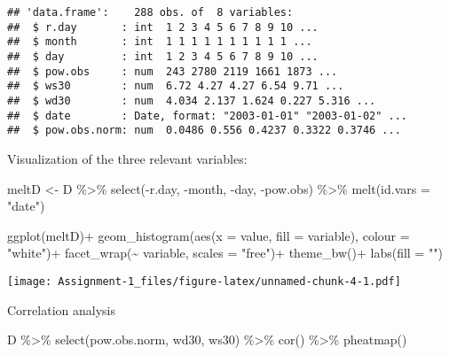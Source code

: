 \documentclass[
]{article}
\newenvironment{Shaded}{\begin{snugshade}}{\end{snugshade}}
\newcommand{\AttributeTok}[1]{\textcolor[rgb]{0.77,0.63,0.00}{#1}}
\newcommand{\FunctionTok}[1]{\textcolor[rgb]{0.00,0.00,0.00}{#1}}
\newcommand{\NormalTok}[1]{#1}
\newcommand{\OtherTok}[1]{\textcolor[rgb]{0.56,0.35,0.01}{#1}}
\newcommand{\SpecialCharTok}[1]{\textcolor[rgb]{0.00,0.00,0.00}{#1}}
\newcommand{\StringTok}[1]{\textcolor[rgb]{0.31,0.60,0.02}{#1}}
\begin{document}
\begin{verbatim}
## 'data.frame':    288 obs. of  8 variables:
##  $ r.day       : int  1 2 3 4 5 6 7 8 9 10 ...
##  $ month       : int  1 1 1 1 1 1 1 1 1 1 ...
##  $ day         : int  1 2 3 4 5 6 7 8 9 10 ...
##  $ pow.obs     : num  243 2780 2119 1661 1873 ...
##  $ ws30        : num  6.72 4.27 4.27 6.54 9.71 ...
##  $ wd30        : num  4.034 2.137 1.624 0.227 5.316 ...
##  $ date        : Date, format: "2003-01-01" "2003-01-02" ...
##  $ pow.obs.norm: num  0.0486 0.556 0.4237 0.3322 0.3746 ...
\end{verbatim}

Visualization of the three relevant variables:

\begin{Shaded}
\begin{Highlighting}[]
\NormalTok{meltD }\OtherTok{\textless{}{-}}\NormalTok{ D }\SpecialCharTok{\%\textgreater{}\%}
  \FunctionTok{select}\NormalTok{(}\SpecialCharTok{{-}}\NormalTok{r.day, }\SpecialCharTok{{-}}\NormalTok{month, }\SpecialCharTok{{-}}\NormalTok{day, }\SpecialCharTok{{-}}\NormalTok{pow.obs) }\SpecialCharTok{\%\textgreater{}\%}
  \FunctionTok{melt}\NormalTok{(}\AttributeTok{id.vars =} \StringTok{"date"}\NormalTok{)}

\FunctionTok{ggplot}\NormalTok{(meltD)}\SpecialCharTok{+}
  \FunctionTok{geom\_histogram}\NormalTok{(}\FunctionTok{aes}\NormalTok{(}\AttributeTok{x =}\NormalTok{ value, }\AttributeTok{fill =}\NormalTok{ variable), }\AttributeTok{colour =} \StringTok{"white"}\NormalTok{)}\SpecialCharTok{+}
  \FunctionTok{facet\_wrap}\NormalTok{(}\SpecialCharTok{\textasciitilde{}}\NormalTok{ variable, }\AttributeTok{scales =} \StringTok{"free"}\NormalTok{)}\SpecialCharTok{+}
  \FunctionTok{theme\_bw}\NormalTok{()}\SpecialCharTok{+}
  \FunctionTok{labs}\NormalTok{(}\AttributeTok{fill =} \StringTok{""}\NormalTok{)}
\end{Highlighting}
\end{Shaded}

\texttt{[image: Assignment-1\_files/figure-latex/unnamed-chunk-4-1.pdf]}

Correlation analysis

\begin{Shaded}
\begin{Highlighting}[]
\NormalTok{D }\SpecialCharTok{\%\textgreater{}\%}
  \FunctionTok{select}\NormalTok{(pow.obs.norm, wd30, ws30) }\SpecialCharTok{\%\textgreater{}\%}
  \FunctionTok{cor}\NormalTok{() }\SpecialCharTok{\%\textgreater{}\%} 
  \FunctionTok{pheatmap}\NormalTok{()}
\end{Highlighting}
\end{Shaded}
\end{document}
